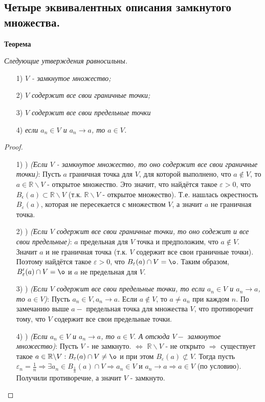 \documentclass[12pt]{article}
\begin{document}
\subsection{Четыре эквивалентных описания замкнутого множества.}

\textbf{Теорема}

\textit{Следующие утверждения равносильны.}

\begin{itemize}
    \item[1)] \textit{$V$ - замкнутое множество;}
    \item[2)] \textit{$V$ содержит все свои граничные точки;}
    \item[3)] \textit{$V$ содержит все свои предельные точки}
    \item[4)] \textit{если $a_n\in V$ и $a_n\rightarrow a$, то $a\in V$.}
\end{itemize}

\begin{proof}
 
\begin{itemize}
    \item[1) \Rightarrow2)]\textit{(Если $V$ - замкнутое множество, то оно содержит все свои граничные точки)}: \newline Пусть $a$ граничная точка для $V$, для которой выполнено, что $a\not\in V$, то $a\in\mathbb{R}\backslash V$ - открытое множество. Это значит, что найдётся такое $\varepsilon > 0$, что $B_\epsilon(a)\subset \mathbb{R}\backslash V$ (т.к. $\mathbb{R}\backslash V$ - открытое множество). Т.е. нашлась окрестность $B_\varepsilon(a)$, которая не пересекается с множеством $V$, а значит $a$ не граничная точка.
    \item[2) \Rightarrow3)] \textit{(Если $V$ содержит все свои граничные точки, то оно содежит и все свои предельные)}:  $a$ предельная для $V$ точка и предположим, что $a \not\in V$. Значит $a$ и не граничная точка (т.к. $V$ содержит все свои граничные точки). Поэтому найдётся такое $\varepsilon > 0$, что $B_\varepsilon(a)\cap V = \o$. Таким образом, $B'_\varepsilon(a)\cap V=\o$ и $a$ не предельная для $V$.
    \item[3) \Rightarrow4)] \textit{(Если $V$ содержит все свои предельные точки, то если $a_n\in V$ и $a_n\rightarrow a$, то $a\in V$)}: \newline Пусть $a_n\in V, a_n\rightarrow a$. Если $a\not\in V$, то $a\neq a_n$ при каждом $n$. По замечанию выше $a - $ предельная точка для множества $V$, что противоречит тому, что $V$ содержит все свои предельные точки.
    \item[4) \Rightarrow1)] \textit{(Если $a_n\in V$ и $a_n\rightarrow a$, то $a\in V$. А отсюда $V - $ замкнутое множество)}: \newline Пусть $V$ - не замкнуто. $\Leftrightarrow$ $\mathbb{R}\backslash V$ - не открыто $\Rightarrow$ существует такое $a\in \mathbb{R}\backslash V: B_\varepsilon(a) \cap V \neq \o$ и при этом $B_\varepsilon(a)\not\subset V$. Тогда пусть $\varepsilon_n = \frac{1}{n} \Rightarrow \exists a_n\in B_{\frac{1}{n}}(a) \cap V \Rightarrow a_n\in V$ и $a_n\rightarrow a \Rightarrow a\in V$ (по условию). Получили противоречие, а значит $V$ - замкнуто.
\end{itemize}
\end{proof}
\end{document}
